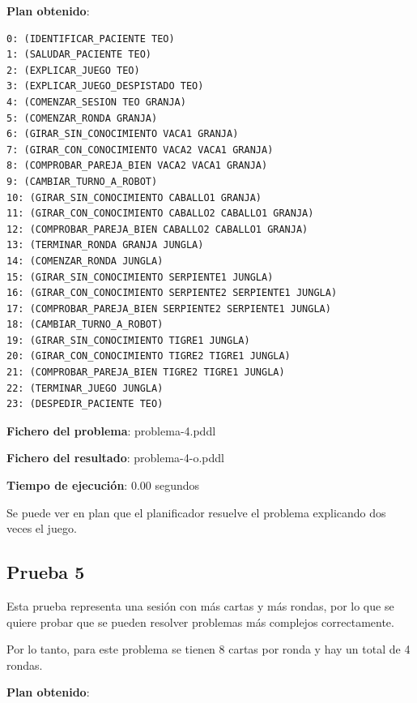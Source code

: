 \documentclass{uc3mpracticas}
\begin{document}
  \begin{multicols}{2}
    \textbf{Plan obtenido}:

    \begin{lstlisting}
0: (IDENTIFICAR_PACIENTE TEO)
1: (SALUDAR_PACIENTE TEO)
2: (EXPLICAR_JUEGO TEO)
3: (EXPLICAR_JUEGO_DESPISTADO TEO)
4: (COMENZAR_SESION TEO GRANJA)
5: (COMENZAR_RONDA GRANJA)
6: (GIRAR_SIN_CONOCIMIENTO VACA1 GRANJA)
7: (GIRAR_CON_CONOCIMIENTO VACA2 VACA1 GRANJA)
8: (COMPROBAR_PAREJA_BIEN VACA2 VACA1 GRANJA)
9: (CAMBIAR_TURNO_A_ROBOT)
10: (GIRAR_SIN_CONOCIMIENTO CABALLO1 GRANJA)
11: (GIRAR_CON_CONOCIMIENTO CABALLO2 CABALLO1 GRANJA)
12: (COMPROBAR_PAREJA_BIEN CABALLO2 CABALLO1 GRANJA)
13: (TERMINAR_RONDA GRANJA JUNGLA)
14: (COMENZAR_RONDA JUNGLA)
15: (GIRAR_SIN_CONOCIMIENTO SERPIENTE1 JUNGLA)
16: (GIRAR_CON_CONOCIMIENTO SERPIENTE2 SERPIENTE1 JUNGLA)
17: (COMPROBAR_PAREJA_BIEN SERPIENTE2 SERPIENTE1 JUNGLA)
18: (CAMBIAR_TURNO_A_ROBOT)
19: (GIRAR_SIN_CONOCIMIENTO TIGRE1 JUNGLA)
20: (GIRAR_CON_CONOCIMIENTO TIGRE2 TIGRE1 JUNGLA)
21: (COMPROBAR_PAREJA_BIEN TIGRE2 TIGRE1 JUNGLA)
22: (TERMINAR_JUEGO JUNGLA)
23: (DESPEDIR_PACIENTE TEO)
    \end{lstlisting}

    \columnbreak

    \textbf{Fichero del problema}: problema-4.pddl

    \textbf{Fichero del resultado}: problema-4-o.pddl

    \textbf{Tiempo de ejecución}: 0.00 segundos
  \end{multicols}

  Se puede ver en plan que el planificador resuelve el problema explicando dos veces el juego.



  \subsection{Prueba 5}

  Esta prueba representa una sesión con más cartas y más rondas, por lo que se quiere probar que se pueden resolver problemas más complejos correctamente.

  \vspace{3mm}

  Por lo tanto, para este problema se tienen 8 cartas por ronda y hay un total de 4 rondas.

  \vspace{3mm}

    \textbf{Plan obtenido}:
\end{document}
